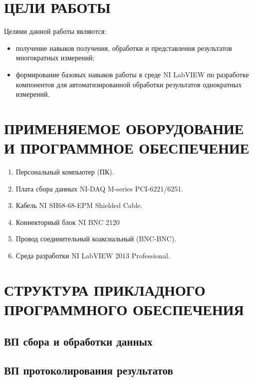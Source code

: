 \documentclass[a4paper,14pt]{article}
\begin{document}

\tableofcontents
\pagebreak

\section{ЦЕЛИ РАБОТЫ}
Целями данной работы являются:

\begin{itemize}
    \item получение навыков получения, обработки и представления результатов многократных измерений;
    \item формирование базовых навыков работы в среде NI LabVIEW по разработке компонентов для автоматизированной обработки результатов однократных измерений.
\end{itemize}

\section{ПРИМЕНЯЕМОЕ ОБОРУДОВАНИЕ И ПРОГРАММНОЕ ОБЕСПЕЧЕНИЕ}

\begin{enumerate}
    \item    Персональный компьютер (ПК).
    \item    Плата сбора данных NI-DAQ M-series PCI-6221/6251.
    \item    Кабель NI SH68-68-EPM Shielded Cable.
    \item    Коннекторный блок NI BNC 2120
    \item    Провод соединительный коаксиальный (BNC-BNC).
    \item    Среда разработки NI LabVIEW 2013 Professional.
\end{enumerate}


\section{СТРУКТУРА ПРИКЛАДНОГО     ПРОГРАММНОГО ОБЕСПЕЧЕНИЯ}
\subsection{ВП сбора и обработки данных}


\subsection{ВП протоколирования результатов}
\end{document}
